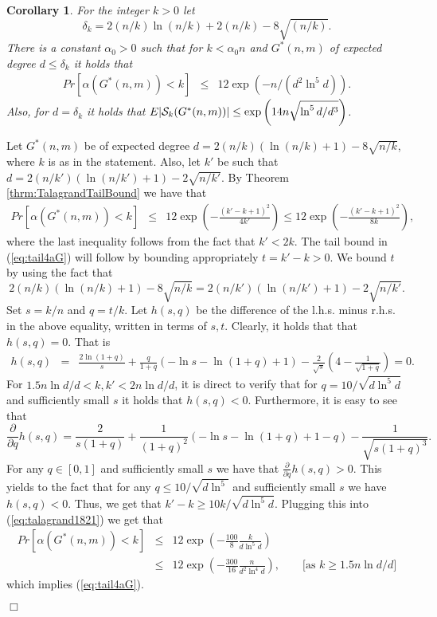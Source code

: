 \documentclass[a4paper,10pt]{article}
\makeatletter
\newtheorem{corollary}{Corollary}\renewcommand{\thecorollary}{\arabic{corollary}}
\newenvironment{proof}{\noindent{\bf Proof\@:}}{\hfill $\Box$\\}
\makeatother
\begin{document}
\begin{corollary}\label{theorem:Reverse-Frieze}
For the integer $k>0$ let
	\begin{displaymath}
	\delta_k = 2(n/k)\ln (n/k)+2(n/k)-8\sqrt{(n/k)}.
	\end{displaymath}
There is a constant $\alpha_0>0$ such that for $k<\alpha_0n$ and $G^*(n,m)$
of expected degree $d\leq \delta_k$ it holds that
\begin{eqnarray}\label{eq:tail4aG}
Pr[\alpha(G^*(n,m))< k]&\leq&12 \exp\left(- n/(d^{2}\ln^5 d)\right).
\end{eqnarray}
Also, for $d=\delta_k$ it holds that
$E|{\cal S}_k(G^*(n,m))|\leq \exp\left( 14 n\sqrt{{\ln^5 d}/{d^3}} \right)$.
\end{corollary}
\begin{proof}
Let $G^*(n,m)$ be of expected degree $d = 2 (n/k)(\ln(n/k)+1)-{8}{\sqrt{n/k}}$,
where $k$ is as in the statement. Also, let $k'$ be such that
$d=2 (n/k')(\ln(n/k')+1)-2{\sqrt{n/k'}}$. By Theorem \ref{thrm:TalagrandTailBound}
we have that
\begin{eqnarray}Pr[\alpha(G^*(n,m))<k]&\leq& 12\exp\left(-\frac{(k'-k+1)^2}{4k'}\right)
\leq 12\exp\left(-\frac{(k'-k+1)^2}{8k}\right), \label{eq:talagrand1821}
\end{eqnarray}
where the last inequality follows from the fact that $k'<2k$. The
tail bound in (\ref{eq:tail4aG}) will follow by bounding appropriately
$t=k'-k>0$. We bound $t$ by using the fact that
\begin{displaymath}
2 (n/k)(\ln(n/k)+1)-{8}{\sqrt{n/k}}=2 (n/k')(\ln(n/k')+1)-2{\sqrt{n/k'}}.
\end{displaymath}
Set $s=k/n$ and $q=t/k$. Let $h(s,q)$ be the difference of the l.h.s.
minus r.h.s. in the above equality, written in terms of $s,t$.
Clearly, it holds that that $h(s,q)=0$. That is
\begin{eqnarray}
h(s,q)
&=&\frac{2\ln(1+q)}{s}+\frac{q}{1+q}\left(-\ln s-\ln(1+q)+1\right)-
\frac{2}{\sqrt{s}}\left(4-\frac{1}{\sqrt{1+q}}\right)=0.
\nonumber
\end{eqnarray}
For $1.5 n\ln d/d < k,k'< 2n\ln d/d$, it is direct to verify that for 
$q=10/\sqrt{d\ln^5 d}$ and sufficiently small $s$ 
it holds that $h(s,q)<0$. Furthermore, it is easy to see that
\begin{displaymath}
\frac{\partial}{\partial q} h(s,q)=\frac{2}{s(1+q)}+
\frac{1}{(1+q)^2}\left(-\ln s-\ln(1+q)+1-q\right)-\frac{1}{\sqrt{s(1+q)^3}}.
\end{displaymath}
For any $q\in [0,1]$ and sufficiently small $s$ we have that
$\frac{\partial}{\partial q} h(s,q)>0$. This yields to the fact
that for any $q\leq 10/\sqrt{d\ln^5}$ and sufficiently small
$s$ we have $h(s,q)<0$. Thus, we get that $k'-k\geq 10k/\sqrt{d\ln^5 d}$.
Plugging this  into (\ref{eq:talagrand1821}) we get that
\begin{eqnarray}
Pr[\alpha(G^*(n,m))<k]&\leq& 12\exp\left(-\frac{100}{8}\frac{k}{d\ln^5 d}\right)
\nonumber \\
&\leq& 12\exp\left(-\frac{300}{16}\frac{n}{d^{2}\ln^4d}\right), \qquad \mbox{[as $k\geq 1.5n \ln d/d$]}
\nonumber
\end{eqnarray}
which implies (\ref{eq:tail4aG}).


\end{proof}
\end{document}
